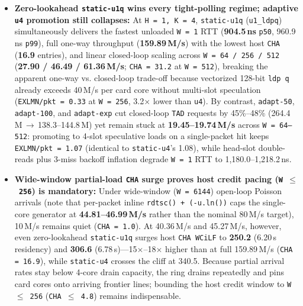 \begin{itemize}
  \item \textbf{Zero-lookahead \texttt{static-u1q} wins every tight-polling regime; adaptive \texttt{u4} promotion still collapses:} At \texttt{H\,=\,1, K\,=\,4}, \texttt{static-u1q} (\texttt{u1\_ldpq}) simultaneously delivers the fastest unloaded \texttt{W\,=\,1} RTT (\textbf{904.5\,ns} \texttt{p50}, 960.9\,ns \texttt{p99}), full one-way throughput (\textbf{159.89\,M/s}) with the lowest host \texttt{CHA} (\textbf{16.9} entries), and linear closed-loop scaling across \texttt{W\,=\,64 / 256 / 512} (\textbf{27.90 / 46.49 / 61.36\,M/s}; \texttt{CHA\,=\,31.2} at \texttt{W\,=\,512}), breaking the apparent one-way vs. closed-loop trade-off because vectorized 128-bit \texttt{ldp q} already exceeds 40\,M/s per card core without multi-slot speculation (\texttt{EXLMN/pkt\,=\,0.33} at \texttt{W\,=\,256}, 3.2$\times$ lower than \texttt{u4}). By contrast, \texttt{adapt-50}, \texttt{adapt-100}, and \texttt{adapt-exp} cut closed-loop \texttt{TAD} requests by 45\%--48\% (264.4\,M\,$\to$\,138.3--144.8\,M) yet remain stuck at \textbf{19.45--19.74\,M/s} across \texttt{W\,=\,64--512}: promoting to 4-slot speculative loads on a single-packet hit keeps \texttt{EXLMN/pkt\,=\,1.07} (identical to \texttt{static-u4}'s 1.08), while head-slot double-reads plus 3-miss backoff inflation degrade \texttt{W\,=\,1} RTT to 1,180.0--1,218.2\,ns.
  \item \textbf{Wide-window partial-load \texttt{CHA} surge proves host credit pacing (\texttt{W\,$\le$\,256}) is mandatory:} Under wide-window (\texttt{W\,=\,6144}) open-loop Poisson arrivals (note that per-packet inline \texttt{rdtsc() + (-u.ln())} caps the single-core generator at \textbf{44.81--46.99\,M/s} rather than the nominal 80\,M/s target), 10\,M/s remains quiet (\texttt{CHA\,=\,1.0}). At 40.36\,M/s and 45.27\,M/s, however, even zero-lookahead \texttt{static-u1q} surges host \texttt{CHA WCiLF} to \textbf{250.2} (6.20\,\textmu s residency) and \textbf{306.6} (6.78\,\textmu s)---15$\times$--18$\times$ higher than at full 159.89\,M/s (\texttt{CHA\,=\,16.9}), while \texttt{static-u4} crosses the cliff at 340.5. Because partial arrival rates stay below 4-core drain capacity, the ring drains repeatedly and pins card cores onto arriving frontier lines; bounding the host credit window to \texttt{W\,$\le$\,256} (\texttt{CHA\,$\le$\,4.8}) remains indispensable.

\end{itemize}
